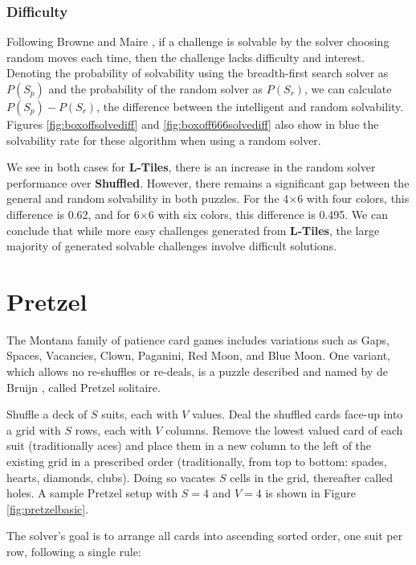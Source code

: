 \documentclass[journal]{IEEEtran}
\begin{document}
\subsubsection{Difficulty}

Following Browne and Maire \cite{MCPUZZLE}, if a challenge is solvable by the solver choosing random moves each time, then the challenge lacks difficulty and interest. Denoting the probability of solvability using the breadth-first search solver as $P(S_p)$ and the probability of the random solver as $P(S_r)$, we can calculate $P(S_p) - P(S_r)$, the difference between the intelligent and random solvability. Figures \ref{fig:boxoffsolvediff} and \ref{fig:boxoff666solvediff} also show in blue the solvability rate for these algorithm when using a random solver. 

We see in both cases for {\bf L-Tiles}, there is an increase in the random solver performance over {\bf Shuffled}. However, there remains a significant gap between the general and random solvability in both puzzles. For the 4$\times$6 with four colors, this difference is 0.62, and for 6$\times$6 with six colors, this difference is 0.495. We can conclude that while more easy challenges generated from {\bf L-Tiles}, the large majority of generated solvable challenges involve difficult solutions.


\section{Pretzel}
The Montana family of patience card games includes variations such as Gaps, Spaces, Vacancies, Clown, Paganini, Red Moon, and Blue Moon. One variant, which allows no re-shuffles or re-deals, is a puzzle described and named by de Bruijn \cite{de1981pretzel}, called Pretzel solitaire.

Shuffle a deck of $S$ suits, each with $V$ values. Deal the shuffled cards face-up into a grid with $S$ rows, each with $V$ columns. Remove the lowest valued card of each suit (traditionally aces) and place them in a new column to the left of the existing grid in a prescribed order (traditionally, from top to bottom: spades, hearts, diamonds, clubs). Doing so vacates $S$ cells in the grid, thereafter called holes. A sample Pretzel setup with $S=4$ and $V=4$ is shown in Figure \ref{fig:pretzelbasic}.

The solver's goal is to arrange all cards into ascending sorted order, one suit per row, following a single rule:
\end{document}
